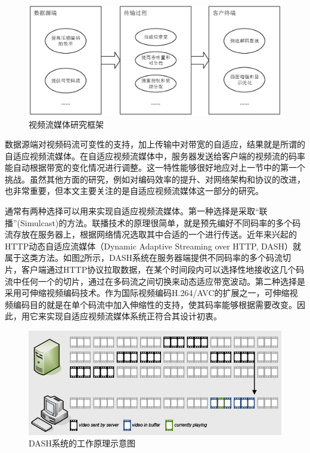 \begin{figure}[h]
	\centering
	\includegraphics[width = 1.0\linewidth]{eps/research-framework}
	\caption{视频流媒体研究框架 \label{fig:research-framework}}
\end{figure}

数据源端对视频码流可变性的支持，加上传输中对带宽的自适应，结果就是所谓的自适应视频流媒体。在自适应视频流媒体中，服务器发送给客户端的视频流的码率能自动根据带宽的变化情况进行调整。这一特性能够很好地应对上一节中的第一个挑战。虽然其他方面的研究，例如对编码效率的提升、对网络架构和协议的改进，也非常重要，但本文主要关注的是自适应视频流媒体这一部分的研究。

通常有两种选择可以用来实现自适应视频流媒体。第一种选择是采取“联播”(Simulcast)的方法。联播技术的原理很简单，就是预先编好不同码率的多个码流存放在服务器上，根据网络情况选取其中合适的一个进行传送。近年来兴起的HTTP动态自适应流媒体（Dynamic Adaptive Streaming over HTTP,  DASH）\supercite{Sodagar2011}就属于这类方法。如图\ref{fig:12}所示，DASH系统在服务器端提供不同码率的多个码流切片，客户端通过HTTP协议拉取数据，在某个时间段内可以选择性地接收这几个码流中任何一个的切片，通过在多码流之间切换来动态适应带宽波动。第二种选择是采用可伸缩视频编码\supercite{SVC-Overview}技术。作为国际视频编码H.264/AVC\supercite{H.264}的扩展之一，可伸缩视频编码目的就是在单个码流中加入伸缩性的支持，使其码率能够根据需要改变。因此，用它来实现自适应视频流媒体系统正符合其设计初衷。

\begin{figure}[h]
	\centering
	\includegraphics[width = 1.0\linewidth]{clip/12.png}
	\caption{DASH系统的工作原理示意图\label{fig:12}}
\end{figure}

